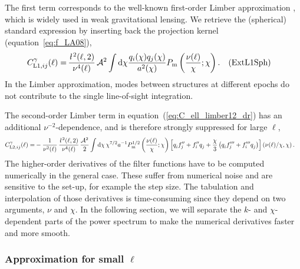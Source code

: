 \documentclass[fleqn,usenatbib]{mnras} %
\newcommand{\ellbar}{\hbox{\it \l}\,}
\newcommand{\pref}{{\cal A}}
\newcommand{\Label}[1]{\quad (\mbox{#1})}
\begin{document}
%
The first term corresponds to the well-known first-order Limber approximation
\citep{1953ApJ...117..134L,1992ApJ...388..272K}, which is widely used in
weak gravitational lensing. We retrieve the (spherical) standard expression by
inserting back the projection kernel (equation~\ref{eq:f_LA08}),
%
\begin{align}
  C^\gamma_{{\rm L1}, ij}(\ell) = & \, \frac{\ellbar^2(\ell, 2)}{\nu^4(\ell)} \, \pref^2 \int {\rm d} \chi \frac{ q_i(\chi) q_j(\chi) }{a^2(\chi)}
  P_{\rm m}\left(\frac{\nu(\ell)}{\chi}; \chi\right) . \Label{ExtL1Sph}
  \label{eq:C_ell_limber1}
\end{align}
%
In the Limber approximation, modes between structures at different epochs do
not contribute to the single line-of-sight integration.

The second-order Limber term in equation~(\ref{eq:C_ell_limber12_dr}) has an additional
$\nu^{-2}$-dependence, and is therefore strongly suppressed for large $\ell$,
%
\begin{align}
  C^\gamma_{{\rm L2}, ij}(\ell) = & - \frac 1 {\nu^2(\ell)} \, \frac{\ellbar^2(\ell, 2)}{\nu^4(\ell)} \,
    \frac{\pref^2}{2}
    \int {\rm d} \chi \, \chi^{7/2} a^{-1} P^{1/2}_{\rm m}\left(\frac{\nu(\ell)}\chi; \chi\right)
    \left[ q^{}_i f^{\prime\prime}_j + f^{\prime\prime}_i q^{}_j
      + \frac{\chi}{3} \left( q^{}_i f^{\prime\prime\prime}_j + f^{\prime\prime\prime}_i q^{}_j
      \right)
    \right](\nu(\ell)/\chi, \chi) \, . 
  \label{eq:C_ell_limber2_dr} 
\end{align}
%
The higher-order derivatives of the filter functions have to be computed
numerically in the general case. These suffer from numerical noise and are
sensitive to the set-up, for example the step size. The tabulation and
interpolation of those derivatives is time-consuming since they depend on two
arguments, $\nu$ and $\chi$. In the following section, we will separate the
$k$- and $\chi$-dependent parts of the power spectrum to make the numerical
derivatives faster and more smooth.

\subsubsection{Approximation for small $\ell$}
\label{sec:factor_D}
\end{document}
